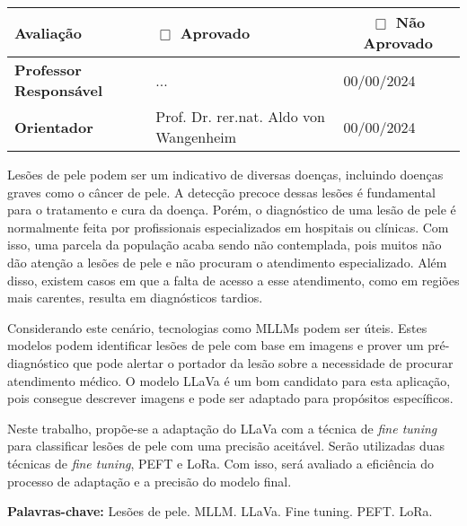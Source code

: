 \begin{folhadeaprovacao}
	\vspace{-4pt}

	\tiny
	\noindent \begin{tabularx}{\textwidth}{| l | X | l | l |}
		\hline
		{\textbf{Avaliação}}             & \multicolumn{1}{l}{\textbf{$\Box$ Aprovado}} & \multicolumn{2}{c|}{\textbf{$\Box$ Não Aprovado}}   \\ \hline
		{\textbf{Professor Responsável}} & {...}                                        & {00/00/2024}                                      & \\ \hline
		{\textbf{Orientador}}            & {Prof. Dr. rer.nat. Aldo von Wangenheim}     & {00/00/2024}                                      & \\ \hline
	\end{tabularx}
\end{folhadeaprovacao}

\setlength{\absparsep}{18pt}
\begin{resumo}
	\SingleSpacing

	Lesões de pele podem ser um indicativo de diversas doenças, incluindo doenças graves como o câncer de pele. A detecção precoce dessas lesões é fundamental para o
	tratamento e cura da doença. Porém, o diagnóstico de uma lesão de pele é normalmente feita por profissionais especializados em hospitais ou clínicas. Com isso, uma
	parcela da população acaba sendo não contemplada, pois muitos não dão atenção a lesões de pele e não procuram o atendimento especializado. Além disso, existem casos
	em que a falta de acesso a esse atendimento, como em regiões mais carentes, resulta em diagnósticos tardios.

	Considerando este cenário, tecnologias como \ac{MLLMs} podem ser úteis. Estes modelos podem identificar lesões de pele com base em imagens e prover um pré-diagnóstico
	que pode alertar o portador da lesão sobre a necessidade de procurar atendimento médico. O modelo \ac{LLaVa} é um bom candidato para esta aplicação, pois consegue
	descrever imagens e pode ser adaptado para propósitos específicos.

	Neste trabalho, propõe-se a adaptação do \ac{LLaVa} com a técnica de \textit{fine tuning} para classificar lesões de pele com uma precisão aceitável. Serão utilizadas
	duas técnicas de \textit{fine tuning}, \ac{PEFT} e \ac{LoRa}. Com isso, será avaliado a eficiência do processo de adaptação e a precisão do modelo final.

	\textbf{Palavras-chave:} Lesões de pele. MLLM. LLaVa. Fine tuning. PEFT. LoRa.
\end{resumo}

